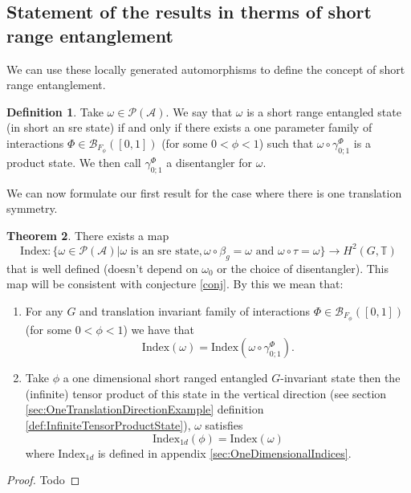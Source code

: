 \documentclass[12pt,a4paper,twoside]{article}
\newcommand{\BB}{\mathcal B}
\newcommand{\PP}{\mathcal P}
\newcommand{\TT}{\mathbb T}
\renewcommand{\AA}{\mathcal A}
\theoremstyle{definition}
\newtheorem{theorem}{Theorem}[section]
\newtheorem{definition}[theorem]{Definition}
\numberwithin{equation}{section}
\begin{document}
\subsection{Statement of the results in therms of short range entanglement}\label{sec:Results_1}
We can use these locally generated automorphisms to define the concept of short range entanglement.
\begin{definition}
	Take $\omega\in\PP(\AA)$. We say that $\omega$ is a short range entangled state (in short an sre state) if and only if there exists a one parameter family of interactions $\Phi\in\BB_{F_\phi}([0,1])$ (for some $0<\phi<1$) such that $\omega\circ\gamma^{\Phi}_{0;1}$ is a product state. We then call $\gamma^{\Phi}_{0;1}$ a disentangler for $\omega$.
\end{definition}
We can now formulate our first result for the case where there is one translation symmetry.
\begin{theorem}
	There exists a map
	\begin{equation}
		\textrm{Index}:\{\omega\in\PP(\AA)|\omega\text{ is an sre state},\omega\circ\beta_g=\omega\text{ and }\omega\circ\tau=\omega\}\rightarrow H^2(G,\TT)
	\end{equation}
	that is well defined (doesn't depend on $\omega_0$ or the choice of disentangler). This map will be consistent with conjecture \ref{conj}. By this we mean that:
	\begin{enumerate}
		\item For any $G$ and translation invariant family of interactions $\Phi\in\BB_{F_{\phi}}([0,1])$ (for some $0<\phi<1$) we have that
		\begin{equation}
			\textrm{Index}(\omega)=\textrm{Index}(\omega\circ\gamma^{\Phi}_{0;1}).
		\end{equation}
		\item Take $\phi$ a one dimensional short ranged entangled $G$-invariant state then the (infinite) tensor product of this state in the vertical direction (see section \ref{sec:OneTranslationDirectionExample} definition \ref{def:InfiniteTensorProductState}), $\omega$ satisfies
		\begin{equation}
			\textrm{Index}_{1d}(\phi)=\textrm{Index}(\omega)
		\end{equation}
		where $\textrm{Index}_{1d}$ is defined in appendix \ref{sec:OneDimensionalIndices}.
	\end{enumerate}
\end{theorem}
\begin{proof}
	{\color{red}Todo}
\end{proof}
\end{document}
